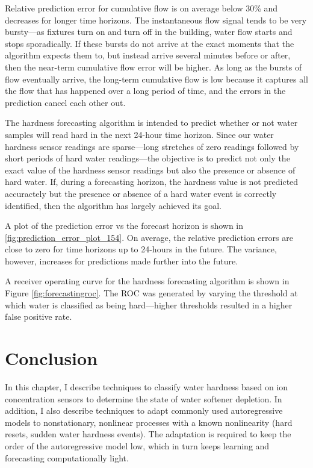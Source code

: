 Relative prediction error for cumulative flow is on average below 30\% and decreases for longer time horizons.
 The instantaneous flow signal tends to be very bursty---as fixtures turn on and turn off in the building, water flow starts and stops sporadically.
 If these bursts do not arrive at the exact moments that the algorithm expects them to, but instead arrive several minutes before or after, then the near-term cumulative flow error will be higher.
 As long as the bursts of flow eventually arrive, the long-term cumulative flow is low because it captures all the flow that has happened over a long period of time, and the errors in the prediction cancel each other out.

The hardness forecasting algorithm is intended to predict whether or not water samples will read hard in the next 24-hour time horizon.
 Since our water hardness sensor readings are sparse---long stretches of zero readings followed by short periods of hard water readings---the objective is to predict not only the exact value of the hardness sensor readings but also the presence or absence of hard water.
 If, during a forecasting horizon, the hardness value is not predicted accuractely but the presence or absence of a hard water event is correctly identified, then the algorithm has largely achieved its goal.

A plot of the prediction error vs the forecast horizon is shown in \ref{fig:prediction_error_plot_154}.
 On average, the relative prediction errors are close to zero for time horizons up to 24-hours in the future.
 The variance, however, increases for predictions made further into the future.


A receiver operating curve for the hardness forecasting algorithm is shown in Figure \ref{fig:forecastingroc}.
 The ROC was generated by varying the threshold at which water is classified as being hard---higher thresholds resulted in a higher false positive rate.


\section{Conclusion}


In this chapter, I describe techniques to classify water hardness based on ion concentration sensors to determine the state of water softener depletion.
 In addition, I also describe techniques to adapt commonly used autoregressive models to nonstationary, nonlinear processes with a known nonlinearity (hard resets, sudden water hardness events).
 The adaptation is required to keep the order of the autoregressive model low, which in turn keeps learning and forecasting computationally light.
